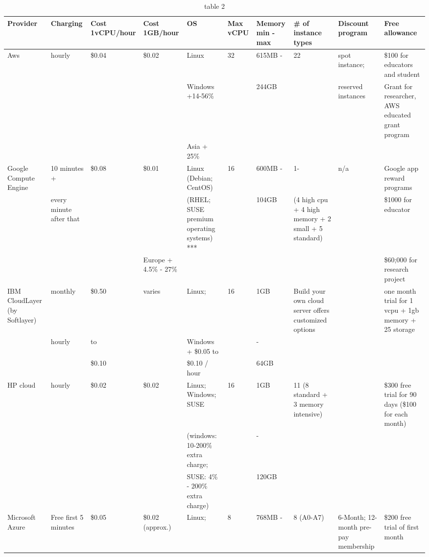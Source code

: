 \documentclass{sig-alternate}
\begin{document}
\begin{table}
\caption{table 2}\label{T:tab2}

\begin{small}
\begin{tabular}{|p{2cm}|p{2cm}|p{1.5cm}|p{1.5cm}|p{2cm}|p{1cm}|p{1.5cm}|p{2cm}|p{2cm}|p{2cm}|}
\hline
Provider & Charging & Cost 1vCPU/hour	   & Cost 1GB/hour & OS & Max vCPU & Memory min - max &\# of instance types & Discount program & Free allowance\\
\hline
\hline
Aws & hourly & \$0.04  & \$0.02  & Linux & 32 & 615MB - & 22 & spot instance;  & \$100 for educators and student\\
    &  	     &         &  	 & Windows +14-56\%   	&    & 244GB    &       & reserved instances & Grant for researcher, AWS educated grant program\\
    &  	     &         &  	 & Asia + 25\% 		&    & 		       &       &  	  	    & \\
\hline
Google Compute Engine & 10 minutes + & \$0.08  & \$0.01  & Linux (Debian; CentOS) & 16 & 600MB - & 1- & n/a & Google app reward programs\\
 & every minute after that &  &  & (RHEL; SUSE premium operating systems) *** &  & 104GB & (4 high cpu + 4 high memory + 2 small + 5 standard) &  & \$1000 for educator\\
 &  &  & Europe + 4.5\% - 27\%  &  &  &  &  &  & \$60;000 for research project\\
\hline 
IBM CloudLayer (by Softlayer) & monthly & \$0.50  & varies & Linux;  & 16 & 1GB  & Build your own cloud server offers customized options &  & one month trial for 1 vcpu + 1gb memory + 25 storage\\
\hline
 & hourly & to &  & Windows + \$0.05 to &  & -  &  &  & \\
 &  & \$0.10  &  &               \$0.10 / hour &  & 64GB &  &  & \\
\hline 
HP cloud & hourly & \$0.02  & \$0.02  & Linux; Windows; SUSE & 16 & 1GB  & 11 (8 standard + 3 memory intensive) &  & \$300 free trial for 90 days (\$100 for each month)\\
 &  &  &  & (windows: 10-200\% extra charge; &  & -  &  &  & \\
 &  &  &  & SUSE: 4\% - 200\% extra charge) &  & 120GB &  &  & \\
\hline 
Microsoft Azure & Free first 5 minutes & \$0.05  & \$0.02 (approx.) & Linux;  & 8 & 768MB -  & 8 (A0-A7) & 6-Month; 12-month pre-pay membership & \$200 free trial of first month\\

\end{tabular}
\end{small}
\end{table}
\end{document}
